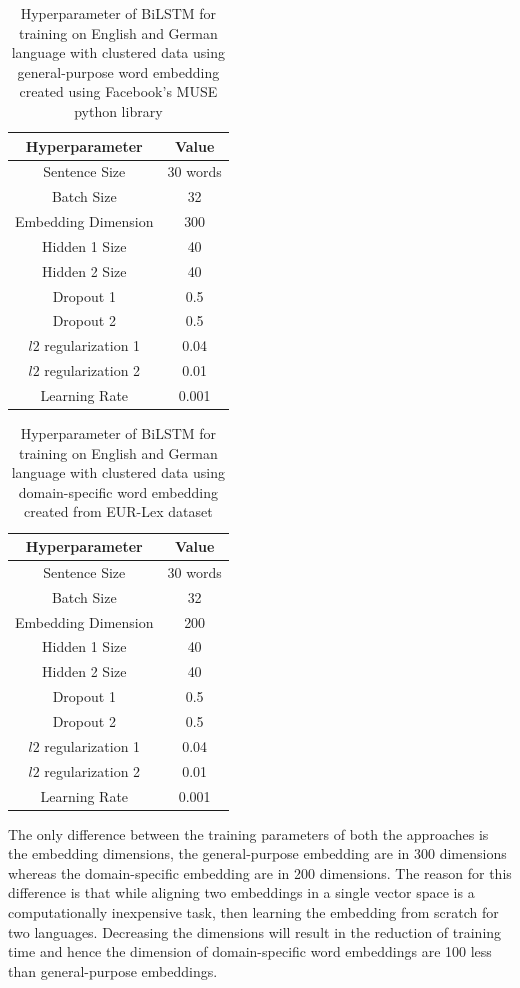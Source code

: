 \begin{table}[!ht]
\centering
\begin{tabular}{cc}
\hline
\textbf{Hyperparameter} & \textbf{Value} \\ \hline
Sentence Size & 30 words \\
Batch Size & 32 \\
Embedding Dimension & 300 \\
Hidden 1 Size & 40 \\
Hidden 2 Size & 40 \\
Dropout 1 & 0.5 \\
Dropout 2 & 0.5 \\
$l2$ regularization 1 & 0.04 \\
$l2$ regularization 2 & 0.01 \\
Learning Rate & 0.001 \\ \hline
\end{tabular}
\captionsetup{justification=centering,margin=2cm}
\caption{Hyperparameter of \gls{BiLSTM} for training on English and German language with clustered data using general-purpose word embedding created using Facebook's MUSE python library}
\label{table:FBMuseGeneralpurpose}
\end{table}

\begin{table}[!ht]
\centering
\begin{tabular}{cc}
\hline
\textbf{Hyperparameter} & \textbf{Value} \\ \hline
Sentence Size & 30 words \\
Batch Size & 32 \\
Embedding Dimension & 200 \\
Hidden 1 Size & 40 \\
Hidden 2 Size & 40 \\
Dropout 1 & 0.5 \\
Dropout 2 & 0.5 \\
$l2$ regularization 1 & 0.04 \\
$l2$ regularization 2 & 0.01 \\
Learning Rate & 0.001 \\ \hline
\end{tabular}
\captionsetup{justification=centering,margin=2cm}
\caption{Hyperparameter of \gls{BiLSTM} for training on English and German language with clustered data using domain-specific word embedding created from EUR-Lex dataset}
\label{table:DomainSpecificHyperparameter}
\end{table}

The only difference between the training parameters of both the approaches is the embedding dimensions, the general-purpose embedding are in 300 dimensions whereas the domain-specific embedding are in 200 dimensions. The reason for this difference is that while aligning two embeddings in a single vector space is a computationally inexpensive task, then learning the embedding from scratch for two languages. Decreasing the dimensions will result in the reduction of training time and hence the dimension of domain-specific word embeddings are 100 less than general-purpose embeddings.

